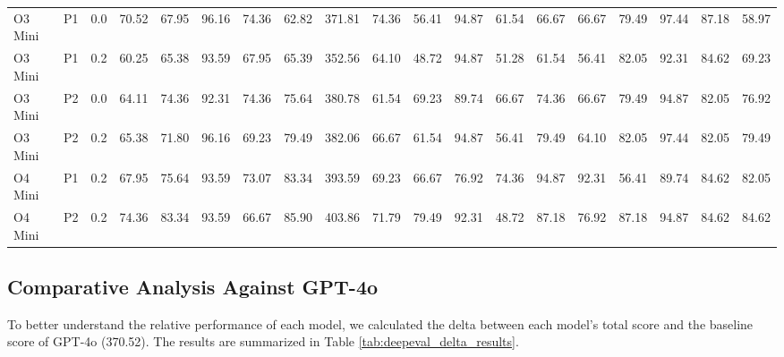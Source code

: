 \begin{landscape}
\begin{longtable}{|l|c|c|ccccc|c|ccccc|ccccc|}
        O3 Mini & P1 & 0.0 & 70.52 & 67.95 & 96.16 & 74.36 & 62.82 & 371.81 & 74.36 & 56.41 & 94.87 & 61.54 & 66.67 & 66.67 & 79.49 & 97.44 & 87.18 & 58.97 \\
        O3 Mini & P1 & 0.2 & 60.25 & 65.38 & 93.59 & 67.95 & 65.39 & 352.56 & 64.10 & 48.72 & 94.87 & 51.28 & 61.54 & 56.41 & 82.05 & 92.31 & 84.62 & 69.23 \\
        O3 Mini & P2 & 0.0 & 64.11 & 74.36 & 92.31 & 74.36 & 75.64 & 380.78 & 61.54 & 69.23 & 89.74 & 66.67 & 74.36 & 66.67 & 79.49 & 94.87 & 82.05 & 76.92 \\
        O3 Mini & P2 & 0.2 & 65.38 & 71.80 & 96.16 & 69.23 & 79.49 & 382.06 & 66.67 & 61.54 & 94.87 & 56.41 & 79.49 & 64.10 & 82.05 & 97.44 & 82.05 & 79.49 \\
        O4 Mini & P1 & 0.2 & 67.95 & 75.64 & 93.59 & 73.07 & 83.34 & 393.59 & 69.23 & 66.67 & 76.92 & 74.36 & 94.87 & 92.31 & 56.41 & 89.74 & 84.62 & 82.05 \\
        O4 Mini & P2 & 0.2 & 74.36 & 83.34 & 93.59 & 66.67 & 85.90 & 403.86 & 71.79 & 79.49 & 92.31 & 48.72 & 87.18 & 76.92 & 87.18 & 94.87 & 84.62 & 84.62 \\
    \end{longtable}
\end{landscape}
\clearpage
\restoregeometry
\pagestyle{headings}

\subsection{Comparative Analysis Against GPT-4o}
\label{sec:comparative_analysis_gpt4o}

To better understand the relative performance of each model, we calculated the delta between each model's total score and the baseline score of GPT-4o (370.52). The results are summarized in Table \ref{tab:deepeval_delta_results}.

